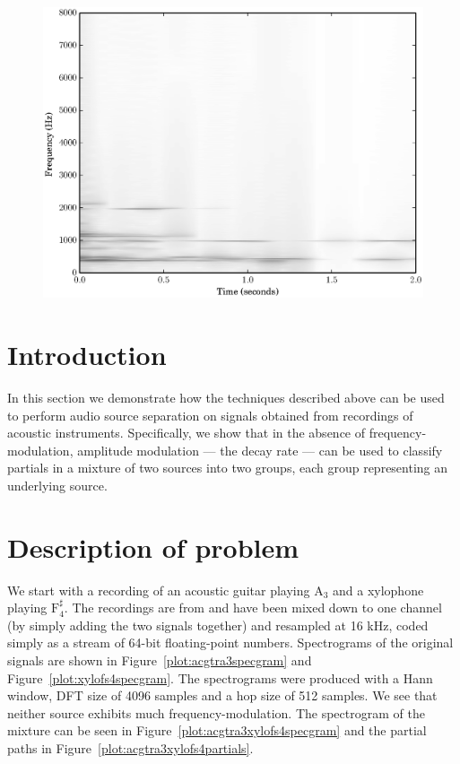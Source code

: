 \begin{figure}[!t]
    \centering
    \includegraphics[width=\figwidthscale\textwidth]{plots/xylo_ss_spec.eps}
    \CaptionWithTitle{%
    }{\label{plot:xylofs4specgramss}}
\end{figure}

\section{Introduction}

In this section we demonstrate how the techniques described above can be used to
perform audio source separation on signals obtained from recordings of acoustic
instruments. Specifically, we show that in the absence of frequency-modulation,
amplitude modulation --- the decay rate --- can be used to classify partials
in a mixture of two sources into two groups, each group representing an
underlying source.

\section{Description of problem}

We start with a recording of an acoustic guitar playing $\text{A}_{3}$ and
a xylophone playing $\text{F}_{4}^{\sharp}$.  The recordings are from
\cite{opolko1987mcgill} and have been mixed down to one channel (by simply
adding the two signals together) and resampled at 16 kHz, coded simply as a
stream of 64-bit floating-point numbers. Spectrograms of the original signals
are shown in Figure~\ref{plot:acgtra3specgram} and
Figure~\ref{plot:xylofs4specgram}. The spectrograms were produced with a Hann
window, DFT size of 4096 samples and a hop size of 512 samples. We see that
neither source exhibits much frequency-modulation. The spectrogram of
the mixture can be seen in Figure~\ref{plot:acgtra3xylofs4specgram} and the
partial paths in Figure~\ref{plot:acgtra3xylofs4partials}.

